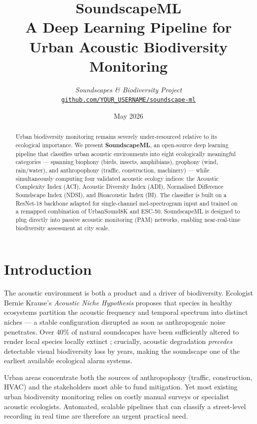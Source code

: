 \documentclass[10pt,twocolumn]{article}
\title{\textbf{SoundscapeML}\\[4pt]
       \large A Deep Learning Pipeline for Urban Acoustic Biodiversity Monitoring}
\author{%
  \textit{Soundscapes \& Biodiversity Project}\\
  \href{https://github.com/YOUR\_USERNAME/soundscape-ml}%
       {\texttt{github.com/YOUR\_USERNAME/soundscape-ml}}
}
\date{May 2026}
\begin{document}
\maketitle

\begin{abstract}
Urban biodiversity monitoring remains severely under-resourced relative to its
ecological importance. We present \textbf{SoundscapeML}, an open-source deep
learning pipeline that classifies urban acoustic environments into eight
ecologically meaningful categories — spanning \textcolor{bio}{biophony} (birds,
insects, amphibians), \textcolor{geo}{geophony} (wind, rain/water), and
\textcolor{anthro}{anthropophony} (traffic, construction, machinery) — while
simultaneously computing four validated acoustic ecology indices: the Acoustic
Complexity Index (ACI), Acoustic Diversity Index (ADI), Normalised Difference
Soundscape Index (NDSI), and Bioacoustic Index (BI). The classifier is built on
a ResNet-18 backbone adapted for single-channel mel-spectrogram input and trained
on a remapped combination of UrbanSound8K and ESC-50. SoundscapeML is designed
to plug directly into passive acoustic monitoring (PAM) networks, enabling
near-real-time biodiversity assessment at city scale.
\end{abstract}

\section{Introduction}

The acoustic environment is both a product and a driver of biodiversity.
Ecologist Bernie Krause's \emph{Acoustic Niche Hypothesis} \cite{krause1993}
proposes that species in healthy ecosystems partition the acoustic frequency
and temporal spectrum into distinct niches — a stable configuration disrupted
as soon as anthropogenic noise penetrates.
Over 40\% of natural soundscapes have been sufficiently altered to render local
species locally extinct \cite{krause2012}; crucially, acoustic degradation
\emph{precedes} detectable visual biodiversity loss by years, making the
soundscape one of the earliest available ecological alarm systems.

Urban areas concentrate both the sources of anthropophony (traffic, construction,
HVAC) and the stakeholders most able to fund mitigation. Yet most existing urban
biodiversity monitoring relies on costly manual surveys or specialist acoustic
ecologists. Automated, scalable pipelines that can classify a street-level
recording in real time are therefore an urgent practical need.
\end{document}
